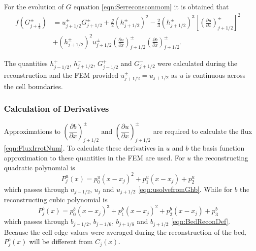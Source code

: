 For the evolution of $G$ equation \eqref{eqn:Serreconsconmom} it is obtained that 
\begin{align}
f\left(G^\pm_{j+\frac{1}{2}}\right) &=  u^\pm_{j + 1/2} G^\pm_{j + 1/2}  + \frac{g}{2}\left(h^\pm_{j + 1/2} \right)^2 - \frac{2}{3}\left(h^\pm_{j + 1/2}\right)^3 \left[\left(\frac{\partial {u}}{\partial x} \right)^\pm_{j + 1/2} \right]^2 \nonumber\\ &+ \left(h^\pm_{j + 1/2}\right)^2 u^\pm_{j + 1/2} \left(\frac{\partial {u}}{\partial x} \right)^\pm_{j + 1/2} \left(\frac{\partial b}{\partial x} \right)^\pm_{j + 1/2} .
\label{eqn:FluxIrrotNum}
\end{align}

The quantities $h^+_{j - 1/2}$, $h^-_{j + 1/2}$, $G^+_{j - 1/2}$ and $G^-_{j + 1/2}$ were calculated during the reconstruction and the FEM provided $u^\pm_{j+1/2} = u_{j+1/2}$ as $u$ is continuous across the cell boundaries.

\subsubsection{Calculation of Derivatives}
Approximations to $\left(\dfrac{\partial {b}}{\partial x} \right)^\pm_{j + 1/2}$ and $\left(\dfrac{\partial {u}}{\partial x} \right)^\pm_{j + 1/2}$ are required to calculate the flux \eqref{eqn:FluxIrrotNum}. To calculate these derivatives in $u$ and $b$ the basis function approximation to these quantities in the FEM are used. For $u$ the reconstructing quadratic polynomial is
	\begin{equation}
	P^u_j(x) = p^u_0 \left(x - x_j\right)^2 + p^u_1 \left(x - x_j\right) + p^u_2
	\label{eqn:Polyforucell}
	\end{equation}
which passes through $u_{j-1/2}$, $u_j$ and $u_{j+1/2}$ \eqref{eqn:usolvefromGhb}. While for $b$ the reconstructing cubic polynomial is
	\begin{equation}
	P^b_j(x) = p^b_0 \left(x - x_j\right)^3 + p^b_1 \left(x - x_j\right)^2 + p^b_2 \left(x - x_j\right)  + p^b_3
	\label{eqn:Polyforbcell}
	\end{equation}
which passes through $b_{j-1/2}$, $b_{j-1/6}$, $b_{j+1/6}$ and $b_{j+1/2}$ \eqref{eqn:BedReconDef}. Because the cell edge values were averaged during the reconstruction of the bed, $P^b_j(x)$ will be different from $C_j(x)$.

